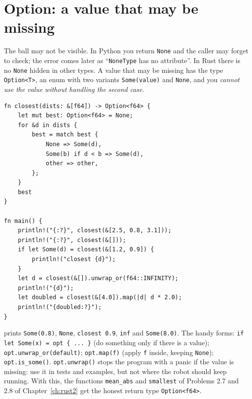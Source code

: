 \section*{Option: a value that may be missing}
The ball may not be visible. In Python you return \verb!None! and the caller may forget to check; the error comes later as ``\verb!NoneType! has no attribute''. In Rust there is no \verb!None! hidden in other types. A value that may be missing has the type \verb!Option<T>!, an enum with two variants \verb!Some(value)! and \verb!None!, and you \emph{cannot use the value without handling the second case}.
\begin{verbatim}
fn closest(dists: &[f64]) -> Option<f64> {
    let mut best: Option<f64> = None;
    for &d in dists {
        best = match best {
            None => Some(d),
            Some(b) if d < b => Some(d),
            other => other,
        };
    }
    best
}

fn main() {
    println!("{:?}", closest(&[2.5, 0.8, 3.1]));
    println!("{:?}", closest(&[]));
    if let Some(d) = closest(&[1.2, 0.9]) {
        println!("closest {d}");
    }
    let d = closest(&[]).unwrap_or(f64::INFINITY);
    println!("{d}");
    let doubled = closest(&[4.0]).map(|d| d * 2.0);
    println!("{doubled:?}");
}
\end{verbatim}
prints \verb!Some(0.8)!, \verb!None!, \verb!closest 0.9!, \verb!inf! and \verb!Some(8.0)!. The handy forms: \verb!if let Some(x) = opt { ... }! (do something only if there is a value); \verb!opt.unwrap_or(default)!; \verb!opt.map(f)! (apply \verb!f! inside, keeping \verb!None!); \verb!opt.is_some()!. \verb!opt.unwrap()! stops the program with a panic if the value is missing: use it in tests and examples, but not where the robot should keep running. With this, the functions \verb!mean_abs! and \verb!smallest! of Problems 2.7 and 2.8 of Chapter~\ref{ch:rust2} get the honest return type \verb!Option<f64>!.

